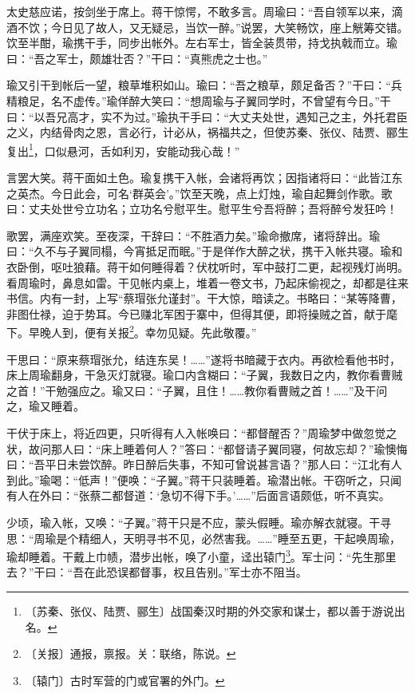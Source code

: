 \documentclass[12pt,UTF-8,openany]{ctexbook}
\begin{document}
\begin{normalsize}
    太史慈应诺，按剑坐于席上。蒋干惊愕，不敢多言。周瑜曰：“吾自领军以来，滴酒不饮；今日见了故人，又无疑忌，当饮一醉。”说罢，大笑畅饮，座上觥筹交错。饮至半酣，瑜携干手，同步出帐外。左右军士，皆全装贯带，持戈执戟而立。瑜曰：“吾之军士，颇雄壮否？”干曰：“真熊虎之士也。”
    
    瑜又引干到帐后一望，粮草堆积如山。瑜曰：“吾之粮草，颇足备否？”干曰：“兵精粮足，名不虚传。”瑜佯醉大笑曰：“想周瑜与子翼同学时，不曾望有今日。”干曰：“以吾兄高才，实不为过。”瑜执干手曰：“大丈夫处世，遇知己之主，外托君臣之义，内结骨肉之恩，言必行，计必从，祸福共之，但使苏秦、张仪、陆贾、郦生复出\footnote{〔苏秦、张仪、陆贾、郦生〕战国秦汉时期的外交家和谋士，都以善于游说出名。}，口似悬河，舌如利刃，安能动我心哉！”
    
    言罢大笑。蒋干面如土色。瑜复携干入帐，会诸将再饮；因指诸将曰：“此皆江东之英杰。今日此会，可名‘群英会’。”饮至天晚，点上灯烛，瑜自起舞剑作歌。歌曰：丈夫处世兮立功名；立功名兮慰平生。慰平生兮吾将醉；吾将醉兮发狂吟！
    
    歌罢，满座欢笑。至夜深，干辞曰：“不胜酒力矣。”瑜命撤席，诸将辞出。瑜曰：“久不与子翼同榻，今宵抵足而眠。”于是佯作大醉之状，携干入帐共寝。瑜和衣卧倒，呕吐狼藉。蒋干如何睡得着？伏枕听时，军中鼓打二更，起视残灯尚明。看周瑜时，鼻息如雷。干见帐内桌上，堆着一卷文书，乃起床偷视之，却都是往来书信。内有一封，上写“蔡瑁张允谨封”。干大惊，暗读之。书略曰：“某等降曹，非图仕禄，迫于势耳。今已赚北军困于寨中，但得其便，即将操贼之首，献于麾下。早晚人到，便有关报\footnote{〔关报〕通报，禀报。关：联络，陈说。}。幸勿见疑。先此敬覆。”
    
    干思曰：“原来蔡瑁张允，结连东吴！……”遂将书暗藏于衣内。再欲检看他书时，床上周瑜翻身，干急灭灯就寝。瑜口内含糊曰：“子翼，我数日之内，教你看曹贼之首！”干勉强应之。瑜又曰：“子翼，且住！……教你看曹贼之首！……”及干问之，瑜又睡着。
    
    干伏于床上，将近四更，只听得有人入帐唤曰：“都督醒否？”周瑜梦中做忽觉之状，故问那人曰：“床上睡着何人？”答曰：“都督请子翼同寝，何故忘却？”瑜懊悔曰：“吾平日未尝饮醉。昨日醉后失事，不知可曾说甚言语？”那人曰：“江北有人到此。”瑜喝：“低声！”便唤：“子翼。”蒋干只装睡着。瑜潜出帐。干窃听之，只闻有人在外曰：“张蔡二都督道：‘急切不得下手。’……”后面言语颇低，听不真实。
    
    少顷，瑜入帐，又唤：“子翼。”蒋干只是不应，蒙头假睡。瑜亦解衣就寝。干寻思：“周瑜是个精细人，天明寻书不见，必然害我。……”睡至五更，干起唤周瑜，瑜却睡着。干戴上巾帻，潜步出帐，唤了小童，迳出辕门\footnote{〔辕门〕古时军营的门或官署的外门。}。军士问：“先生那里去？”干曰：“吾在此恐误都督事，权且告别。”军士亦不阻当。
    

\end{normalsize}
\end{document}
